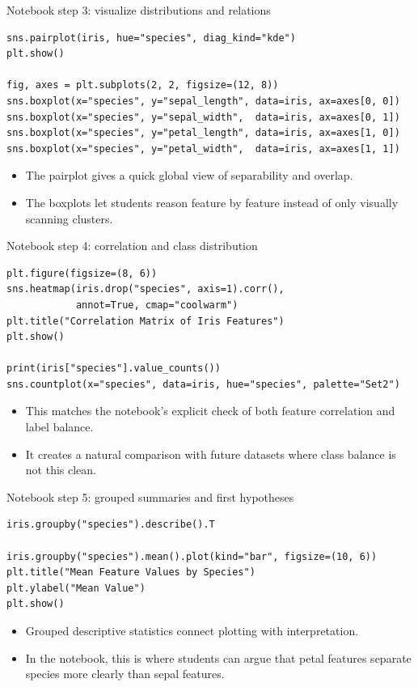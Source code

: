 \begin{frame}[fragile]{Notebook step 3: visualize distributions and relations}
\begin{lstlisting}[style=coursepython]
sns.pairplot(iris, hue="species", diag_kind="kde")
plt.show()

fig, axes = plt.subplots(2, 2, figsize=(12, 8))
sns.boxplot(x="species", y="sepal_length", data=iris, ax=axes[0, 0])
sns.boxplot(x="species", y="sepal_width",  data=iris, ax=axes[0, 1])
sns.boxplot(x="species", y="petal_length", data=iris, ax=axes[1, 0])
sns.boxplot(x="species", y="petal_width",  data=iris, ax=axes[1, 1])
\end{lstlisting}
\begin{itemize}
\item The pairplot gives a quick global view of separability and overlap.
\item The boxplots let students reason feature by feature instead of only visually scanning clusters.
\end{itemize}
\coursefooter
\end{frame}

\begin{frame}[fragile]{Notebook step 4: correlation and class distribution}
\begin{lstlisting}[style=coursepython]
plt.figure(figsize=(8, 6))
sns.heatmap(iris.drop("species", axis=1).corr(),
            annot=True, cmap="coolwarm")
plt.title("Correlation Matrix of Iris Features")
plt.show()

print(iris["species"].value_counts())
sns.countplot(x="species", data=iris, hue="species", palette="Set2")
\end{lstlisting}
\begin{itemize}
\item This matches the notebook's explicit check of both feature correlation and label balance.
\item It creates a natural comparison with future datasets where class balance is not this clean.
\end{itemize}
\coursefooter
\end{frame}

\begin{frame}[fragile]{Notebook step 5: grouped summaries and first hypotheses}
\begin{lstlisting}[style=coursepython]
iris.groupby("species").describe().T

iris.groupby("species").mean().plot(kind="bar", figsize=(10, 6))
plt.title("Mean Feature Values by Species")
plt.ylabel("Mean Value")
plt.show()
\end{lstlisting}
\begin{itemize}
\item Grouped descriptive statistics connect plotting with interpretation.
\item In the notebook, this is where students can argue that petal features separate species more clearly than sepal features.
\end{itemize}
\coursefooter
\end{frame}


